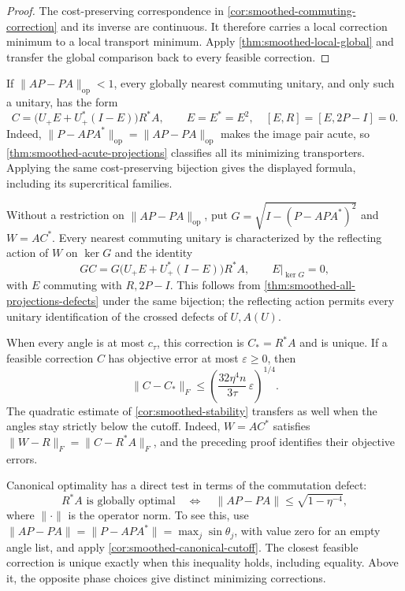 \begin{proof}
The cost-preserving correspondence in
\cref{cor:smoothed-commuting-correction} and its inverse are continuous.
It therefore carries a local correction minimum to a local transport
minimum. Apply \cref{thm:smoothed-local-global} and transfer the global
comparison back to every feasible correction.
\end{proof}

If $\|AP-PA\|_{\mathrm{op}}<1$, every globally nearest commuting
unitary, and only such a unitary, has the form
\[
 C=\bigl(U_+E+U_+^*(I-E)\bigr)R^*A,
 \qquad E=E^*=E^2,\quad [E,R]=[E,2P-I]=0.
\]
Indeed, $\|P-APA^*\|_{\mathrm{op}}=\|AP-PA\|_{\mathrm{op}}$ makes
the image pair acute, so \cref{thm:smoothed-acute-projections} classifies
all its minimizing transporters. Applying the same cost-preserving
bijection gives the displayed formula, including its supercritical
families.

Without a restriction on $\|AP-PA\|_{\mathrm{op}}$, put
$G=\sqrt{I-(P-APA^*)^2}$ and $W=AC^*$.
Every nearest commuting unitary is characterized by the reflecting
action of $W$ on $\ker G$ and the identity
\[
 GC=G\bigl(U_+E+U_+^*(I-E)\bigr)R^*A,
 \qquad E|_{\ker G}=0,
\]
with $E$ commuting with $R,2P-I$. This follows from
\cref{thm:smoothed-all-projections-defects} under the same bijection;
the reflecting action permits every unitary identification of the
crossed defects of $U,A(U)$.

When every angle is at most $c_\tau$, this correction is $C_*=R^*A$
and is unique. If a feasible correction $C$ has objective error at most
$\varepsilon\geq0$, then
\[
 \|C-C_*\|_F\leq
 \left(\frac{32\eta^4n}{3\tau}\,\varepsilon\right)^{1/4}.
\]
The quadratic estimate of \cref{cor:smoothed-stability} transfers as well
when the angles stay strictly below the cutoff. Indeed,
$W=AC^*$ satisfies
$\|W-R\|_F=\|C-R^*A\|_F$, and the preceding proof identifies their
objective errors.

Canonical optimality has a direct test in terms of the commutation defect:
\[
 R^*A\text{ is globally optimal}
 \quad\Longleftrightarrow\quad
 \|AP-PA\|\leq\sqrt{1-\eta^{-4}},
\]
where $\|\cdot\|$ is the operator norm. To see this, use
$\|AP-PA\|=\|P-APA^*\|=\max_j\sin\theta_j$, with value zero for an
empty angle list, and apply \cref{cor:smoothed-canonical-cutoff}.
The closest feasible correction is unique exactly when this inequality
holds, including equality. Above it, the opposite phase choices give
distinct minimizing corrections.

